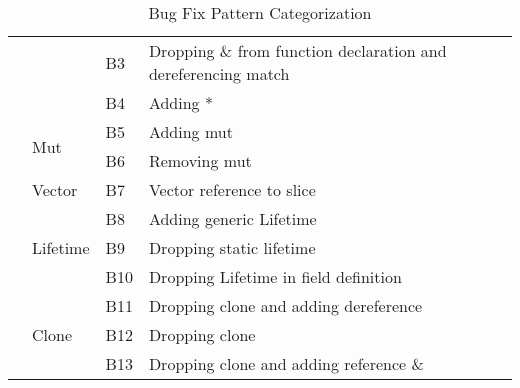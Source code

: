 \begin{table}[]
\begin{tabular}{|l|l|l|l|}
                                 &                                & B3  & Dropping \& from function declaration and dereferencing match \\
                                 &                                & B4  & Adding *                                                            \\\cline{2-3}
                                 & \multirow{2}{*}{Mut}           & B5  & Adding mut                                                          \\
                                 &                                & B6  & Removing mut                                                        \\\cline{2-3}
                                 & Vector                         & B7  & Vector reference to slice                                           \\\cline{2-3}
                                 & \multirow{3}{*}{Lifetime}      & B8  & Adding generic Lifetime                                             \\
                                 &                                & B9  & Dropping static lifetime                                            \\
                                 &                                & B10 & Dropping Lifetime in field definition                               \\\cline{2-3}
                                 & \multirow{3}{*}{Clone}         & B11 & Dropping clone and adding dereference                               \\
                                 &                                & B12 & Dropping clone                                                      \\
                                 &                                & B13 & Dropping clone and adding reference  \& 

\end{tabular}
\caption{\label{fig:category}Bug Fix Pattern Categorization}
\end{table}
